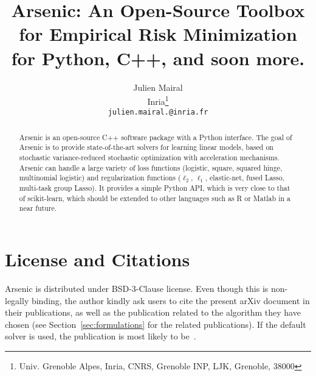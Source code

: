 \documentclass{article}
\title{Arsenic: An Open-Source Toolbox for Empirical Risk Minimization \\ 
for Python, C++, and soon more.
}
\author{
Julien Mairal \\
   Inria\thanks{Univ. Grenoble Alpes, Inria, CNRS, Grenoble INP, LJK, Grenoble, 38000}\\
         \texttt{julien.mairal.@inria.fr}}
\begin{document}
\maketitle

\begin{abstract}
   Arsenic is an open-source C++ software package with a Python interface. 
   The goal of Arsenic is to provide state-of-the-art solvers for learning linear models,
   based on stochastic variance-reduced stochastic optimization with
   acceleration mechanisms.
   Arsenic can handle a large variety of loss functions (logistic, square,
   squared hinge, multinomial logistic) and regularization functions ($\ell_2$,
   $\ell_1$, elastic-net, fused Lasso, multi-task group Lasso).
   It provides a simple Python API, which is very close to that of scikit-learn,
   which should be extended to other languages such as R or Matlab in a near future.
\end{abstract}

\section{License and Citations}
Arsenic is distributed under BSD-3-Clause license. Even though this is non-legally binding, the author kindly ask users to cite the present arXiv document in their publications, as well as the publication related to the algorithm they have chosen (see Section~\ref{sec:formulations} for the related publications). If the default solver is used, the publication is most likely to be~\citep{lin2019inexact}.
\end{document}

